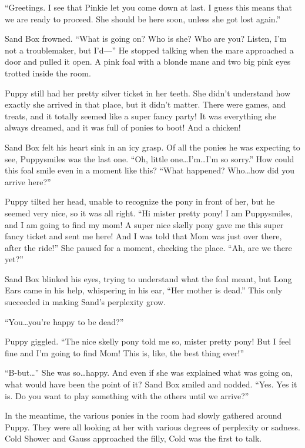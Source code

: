 ``Greetings. I see that Pinkie let you come down at last. I guess this means that we are ready to proceed. She should be here soon, unless she got lost again.''

Sand Box frowned. ``What is going on? Who is she? Who are you? Listen, I'm not a troublemaker, but I'd---'' He stopped talking when the mare approached a door and pulled it open. A pink foal with a blonde mane and two big pink eyes trotted inside the room.

Puppy still had her pretty silver ticket in her teeth. She didn't understand how exactly she arrived in that place, but it didn't matter. There were games, and treats, and it totally seemed like a super fancy party! It was everything she always dreamed, and it was full of ponies to boot! And a chicken!

Sand Box felt his heart sink in an icy grasp. Of all the ponies he was expecting to see, Puppysmiles was the last one. ``Oh, little one\dots I'm\dots I'm so sorry.'' How could this foal smile even in a moment like this? ``What happened? Who\dots how did you arrive here?''

Puppy tilted her head, unable to recognize the pony in front of her, but he seemed very nice, so it was all right. ``Hi mister pretty pony! I am Puppysmiles, and I am going to find my mom! A super nice skelly pony gave me this super fancy ticket and sent me here! And I was told that Mom was just over there, after the ride!'' She paused for a moment, checking the place. ``Ah, are we there yet?''

Sand Box blinked his eyes, trying to understand what the foal meant, but Long Ears came in his help, whispering in his ear, ``Her mother is dead.'' This only succeeded in making Sand's perplexity grow.

``You\dots you're happy to be dead?''

Puppy giggled. ``The nice skelly pony told me so, mister pretty pony! But I feel fine and I'm going to find Mom! This is, like, the best thing ever!''

``B-but\dots'' She was so\dots happy. And even if she was explained what was going on, what would have been the point of it? Sand Box smiled and nodded. ``Yes. Yes it is. Do you want to play something with the others until we arrive?''

In the meantime, the various ponies in the room had slowly gathered around Puppy. They were all looking at her with various degrees of perplexity or sadness. Cold Shower and Gauss approached the filly, Cold was the first to talk.

